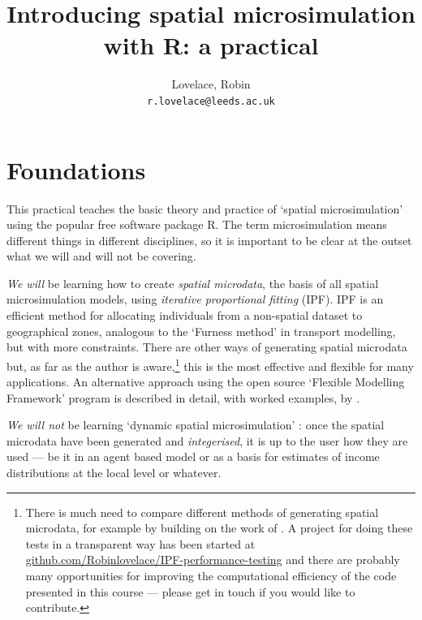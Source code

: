 \documentclass[a4paper, 11pt, twoside]{article}
\begin{document}
 
\title{Introducing spatial microsimulation with R: a practical}
\pagestyle{myheadings}
\author{Lovelace, Robin\\
\texttt{r.lovelace@leeds.ac.uk}}
\maketitle

\tableofcontents

\newpage
\section{Foundations}

This practical teaches the basic theory and practice of `spatial microsimulation'
using the popular free software package R. The term microsimulation means
different things in different disciplines, so it is important to be clear
at the outset what we will and will not be covering.

\emph{We will} be learning how to create \emph{spatial microdata}, the
basis of all spatial microsimulation models, using \emph{iterative
proportional fitting} (IPF). IPF is
an efficient method for allocating individuals from a
non-spatial dataset to geographical zones, analogous to the
`Furness method' in transport modelling, but with more constraints.
There are other ways of generating
spatial microdata but, as far as the author is
aware,\footnote{There is much need
to compare different methods of generating spatial microdata, for example by
building on the work of \citep{harland2012}. A project for doing
these tests in a transparent way has been started at
\href{https://github.com/Robinlovelace/IPF-performance-testing}{github.com/Robinlovelace/IPF-performance-testing}
and there are probably many opportunities for improving the computational efficiency
of the code presented in this course --- please get in touch if you would
like to contribute.}
this is the most effective and flexible for many applications.
An alternative approach using the open source `Flexible Modelling Framework'
program is described in detail, with worked examples, by \citet{harland2013microsimulation}.

\emph{We will not} be learning `dynamic spatial microsimulation'
\citep{Ballas2005b}: once the
spatial microdata have been generated and \emph{integerised}, it is up to the
user how they are used --- be it in an agent based model or as a basis for
estimates of income distributions at the local level or whatever.
\end{document}
